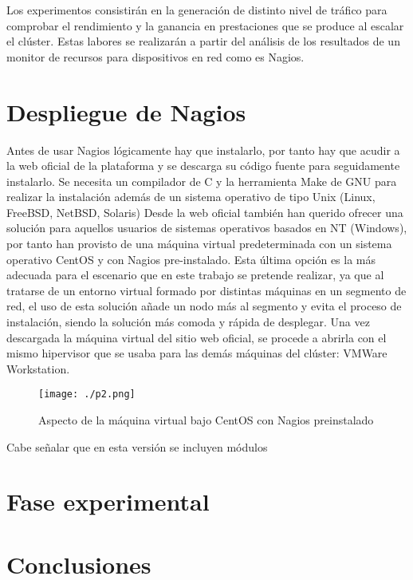 \documentclass[paper=a4, fontsize=12pt]{scrartcl} %
\begin{document}
Los experimentos consistirán en la generación de distinto nivel de tráfico para comprobar el rendimiento y la ganancia en prestaciones que se produce al escalar el clúster. Estas labores se realizarán a partir del análisis de los resultados de un monitor de recursos para dispositivos en red como es Nagios.

\section{Despliegue de Nagios}

Antes de usar Nagios lógicamente hay que instalarlo, por tanto hay que acudir a la web oficial de la plataforma y se descarga su código fuente para seguidamente instalarlo. Se necesita un compilador de C y la herramienta Make de GNU para realizar la instalación además de un sistema operativo de tipo Unix (Linux, FreeBSD, NetBSD, Solaris) \cite{p1}
Desde la web oficial también han querido ofrecer una solución para aquellos usuarios de sistemas operativos basados en NT (Windows), por tanto han provisto de una máquina virtual predeterminada con un sistema operativo CentOS y con Nagios pre-instalado.
Esta última opción es la más adecuada para el escenario que en este trabajo se pretende realizar, ya que al tratarse de un entorno virtual formado por distintas máquinas en un segmento de red, el uso de esta solución añade un nodo más al segmento y evita el proceso de instalación, siendo la solución más comoda y rápida de desplegar. \cite{p2}
Una vez descargada la máquina virtual del sitio web oficial, se procede a abrirla con el mismo hipervisor que se usaba para las demás máquinas del clúster: VMWare Workstation.

\begin{figure}[H] %
	\centering
	\label{lsblk}
	\texttt{[image: ./p2.png]}
	\caption{Aspecto de la máquina virtual bajo CentOS con Nagios preinstalado} 
\end{figure}

Cabe señalar que en esta versión se incluyen módulos


\section{Fase experimental}

\section{Conclusiones}


\end{document}
